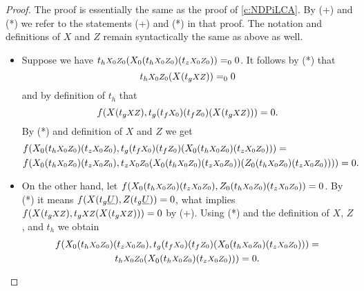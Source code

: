 %
%
\begin{proof}
The proof is essentially the same as the proof of \ref{c:NDPiLCA}. 
By (+) and (*) we refer to the statements (+) and (*) in that proof. The
notation and definitions of $X$ and $Z$ remain 
syntactically the same as above as well. 
\begin{itemize}
\item Suppose we have $t_h\args{X_0Z_0}(X_0(t_h\args{X_0Z_0})(t_z\args{X_0Z_0}))=_00$. It 
follows by (*) that \[t_h\args{X_0Z_0}(X(t_g\args{XZ}))=_00\] and by definition of $t_h$ that
\[f(X(t_g\args{XZ}), t_g(t_f\args{X_0})(t_f\args{Z_0})(X(t_g\args{XZ})))= 0\text{.}\]
By (*) and definition of $X$ and $Z$ we get 
\begin{align*}
&f(X_0(t_h\args{X_0Z_0})(t_z\args{X_0Z_0}),t_g(t_f\args{X_0})(t_f\args{Z_0})(X_0(t_h\args{X_0Z_0})(t_z\args{X_0Z_0})))=\\
&f( X_0(t_h\args{X_0Z_0})(t_z\args{X_0Z_0}) , t_z\args{X_0Z_0}(X_0(t_h\args{X_0Z_0})(t_z\args{X_0Z_0}))(Z_0(t_h\args{X_0Z_0})(t_z\args{X_0Z_0}))) ) = 0
\text{.}
\end{align*}
\item On the other hand, let 
$f( X_0(t_h\args{X_0Z_0})(t_z\args{X_0Z_0}) , Z_0(t_h\args{X_0Z_0})(t_z\args{X_0Z_0}) ) = 0$.
By (*) it means $f( X(t_g\underline{U}) ,  Z(t_g\underline{U}) ) = 0$, what implies
$f(X(t_g\args{XZ}),t_g\args{XZ}(X(t_g\args{XZ}))) = 0$ by (+). Using (*) and
the definition of $X$, $Z$, and $t_h$ we obtain
\begin{multline*}
 f(X_0(t_h\args{X_0Z_0})(t_z\args{X_0Z_0})  , 
       t_g(t_f\args{X_0})(t_f\args{Z_0})(X_0(t_h\args{X_0Z_0})(t_z\args{X_0Z_0}))) =  \\
   t_h\args{X_0Z_0}(X_0(t_h\args{X_0Z_0})(t_z\args{X_0Z_0}))) = 0
\text{.}
\end{multline*}
\end{itemize}
\end{proof}
%
%
